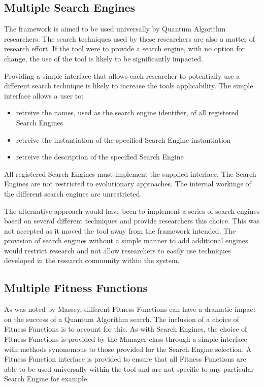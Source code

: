 \subsection{Multiple Search Engines}
The framework is aimed to be used universally by Quantum Algorithm researchers.
The search techniques used by these researchers are also a matter of research effort.
If the tool were to provide a search engine, with no option for change, the use of the tool is likely to be significantly impacted.

Providing a simple interface that allows each researcher to potentially use a different search technique is likely to increase the tools applicability.
The simple interface allows a user to:
\begin{itemize}
 \item retreive the names, used as the search engine identifier, of all registered Search Engines
 \item retreive the instantiation of the specified Search Engine instantiation
 \item retreive the description of the specified Search Engine
\end{itemize}

All registered Search Engines must implement the supplied interface.
The Search Engines are not restricted to evolutionary approaches.
The internal workings of the different search engines are unrestricted.

The alternative approach would have been to implement a series of search engines based on several different techniques and provide researchers this choice.
This was not accepted as it moved the tool away from the framework intended.
The provision of search engines without a simple manner to add additional engines would restrict research and not allow researchers to easily use techniques developed in the research community within the system.

\subsection{Multiple Fitness Functions}
As was noted by Massey\cite{masseythesis}, different Fitness Functions can have a dramatic impact on the success of a Quantum Algorithm search.
The inclusion of a choice of Fitness Functions is to account for this.
As with Search Engines, the choice of Fitness Functions is provided by the Manager class through a simple interface with methods synonomous to those provided for the Search Engine selection.
A Fitness Function interface is provided to ensure that all Fitness Functions are able to be used universally within the tool and are not specific to any particular Search Engine for example.


